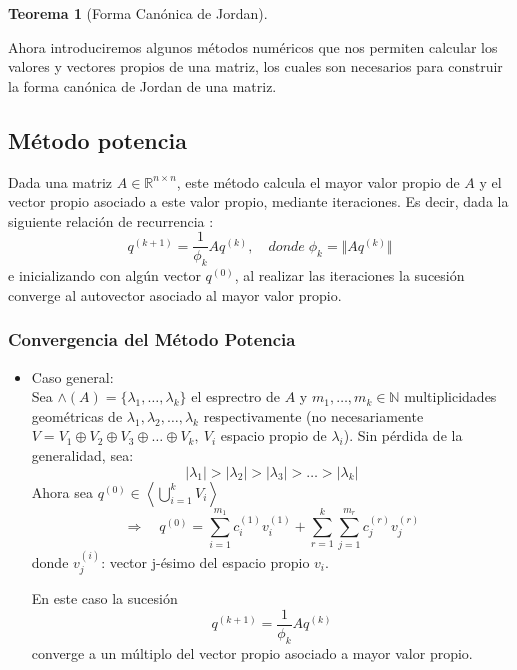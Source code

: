 \documentclass[12pt,a4paper]{article}
\newtheorem{mytheo}{Teorema}[section]
\begin{document}
\begin{multicols}{2}
\begin{mytheo}[Forma Canónica de Jordan]
\begin{enumerate}
	
\end{enumerate}
\end{mytheo}
\noindent Ahora introduciremos algunos métodos numéricos que nos permiten calcular los valores y vectores  propios de una matriz, los cuales son necesarios para construir la forma canónica de Jordan de una matriz.
\subsection{Método potencia}
\noindent Dada una matriz $A\in \mathbb{R}^{n\times n}$, este método calcula el mayor valor propio de $A$ y el vector propio asociado a este valor propio, mediante iteraciones.
Es decir, dada la siguiente relación de recurrencia :\begin{equation*}
    q^{(k+1)} = \frac{1}{\phi_{k}}Aq^{(k)},\quad donde\;\phi_{k} = \Vert Aq^{(k)}\Vert    
\end{equation*} e inicializando con algún vector $q^{(0)}$, al realizar las iteraciones la sucesión converge al autovector asociado al mayor valor propio.


\subsubsection{Convergencia del Método Potencia}
\begin{itemize}
\item Caso general:\\
Sea $\wedge(A)=\{\lambda_{1},\ldots,\lambda_{k}\}$ el esprectro de $A$ y $m_{1}, \ldots , m_{k}\in\mathbb{N}$ multiplicidades geométricas de $\lambda_{1},\lambda_{2},\ldots ,\lambda_{k}$ respectivamente (no necesariamente\\ $V=V_{1}\oplus V_{2}\oplus V_{3}\oplus\ldots\oplus V_{k},\ V_{i}$ espacio propio de $\lambda_{i}$).
Sin pérdida de la generalidad, sea:
$$\vert\lambda_{1}\vert > \vert\lambda_{2}\vert > \vert\lambda_{3}\vert > \ldots>\vert\lambda_{k}\vert$$
Ahora sea $q^{(0)}\in\left<\bigcup_{i=1}^{k}V_{i}\right>$
$$\Rightarrow\quad q^{(0)} = \sum_{i=1}^{m_{1}}c_{i}^{(1)}v_{i}^{(1)} + \sum_{r=1}^{k}\sum_{j=1}^{m_{r}}c_{j}^{(r)}v_{j}^{(r)}$$
donde $v_{j}^{(i)}$: vector j-ésimo del espacio propio $v_{i}$.



En este caso la sucesión $$q^{(k+1)}=\frac{1}{\phi_{k}}Aq^{(k)}$$ converge a un múltiplo del vector propio asociado a mayor valor propio.\\
\end{itemize}


\end{multicols}
\end{document}
